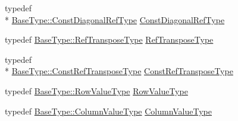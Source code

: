 \begin{DoxyCompactItemize}
\item 
typedef \\*
\hyperlink{classvct_fixed_size_const_matrix_base_a54699d7dbe28072365fab4aa99c68d66}{Base\-Type\-::\-Const\-Diagonal\-Ref\-Type} \hyperlink{classvct_fixed_size_matrix_base_a34c960d927329c09d97b6b69196c2cbe}{Const\-Diagonal\-Ref\-Type}
\item 
typedef \hyperlink{classvct_fixed_size_const_matrix_base_a8d6e7ad2cf2cd82aebbc3de0d6479dbe}{Base\-Type\-::\-Ref\-Transpose\-Type} \hyperlink{classvct_fixed_size_matrix_base_aaddf4b1c77971ed669535edb04d02628}{Ref\-Transpose\-Type}
\item 
typedef \\*
\hyperlink{classvct_fixed_size_const_matrix_base_a41d41a9a3dc6d0c8e36348a8c2fc83db}{Base\-Type\-::\-Const\-Ref\-Transpose\-Type} \hyperlink{classvct_fixed_size_matrix_base_abea4d6acc16784903d485542c24d8446}{Const\-Ref\-Transpose\-Type}
\item 
typedef \hyperlink{classvct_fixed_size_const_matrix_base_a085661aab062c6d975e558be1cfae2d7}{Base\-Type\-::\-Row\-Value\-Type} \hyperlink{classvct_fixed_size_matrix_base_a63ea40ab7299ff1f714ba077ef1fe568}{Row\-Value\-Type}
\item 
typedef \hyperlink{classvct_fixed_size_const_matrix_base_a1c4e4fda1ae603282d28745d3ec78493}{Base\-Type\-::\-Column\-Value\-Type} \hyperlink{classvct_fixed_size_matrix_base_a7420316140dde042d228bc02fb98d4a7}{Column\-Value\-Type}
\end{DoxyCompactItemize}
